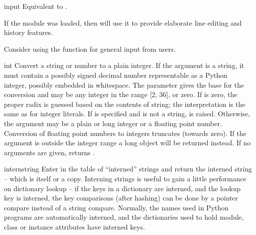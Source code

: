 \begin{funcdesc}{input}{}
  Equivalent to .

  If the  module was loaded, then
   will use it to provide elaborate line editing and
  history features.

  Consider using the  function for general input
  from users.
\end{funcdesc}

\begin{funcdesc}{int}{}
  Convert a string or number to a plain integer.  If the argument is a
  string, it must contain a possibly signed decimal number
  representable as a Python integer, possibly embedded in whitespace.
  The  parameter gives the base for the
  conversion and may be any integer in the range [2, 36], or zero.  If
   is zero, the proper radix is guessed based on the
  contents of string; the interpretation is the same as for integer
  literals.  If  is specified and  is not a string,
   is raised.
  Otherwise, the argument may be a plain or
  long integer or a floating point number.  Conversion of floating
  point numbers to integers truncates (towards zero).
  If the argument is outside the integer range a long object will
  be returned instead.  If no arguments are given, returns .
\end{funcdesc}

\begin{funcdesc}{intern}{string}
  Enter  in the table of ``interned'' strings and return
  the interned string -- which is  itself or a copy.
  Interning strings is useful to gain a little performance on
  dictionary lookup -- if the keys in a dictionary are interned, and
  the lookup key is interned, the key comparisons (after hashing) can
  be done by a pointer compare instead of a string compare.  Normally,
  the names used in Python programs are automatically interned, and
  the dictionaries used to hold module, class or instance attributes
  have interned keys.  
\end{funcdesc}

